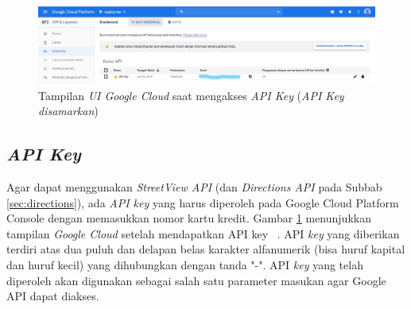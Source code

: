 \begin{figure}[h]
	\centering
		\includegraphics[width=6in]{Gambar/google_cloud.png}
	\caption{Tampilan \textit{UI Google Cloud} saat mengakses \textit{API Key} (\textit{API Key disamarkan})}
	\label{fig:googlecloud}
\end{figure}

\subsection{{\it API Key}}
\label{subs:api-key}
Agar dapat menggunakan {\it StreetView API} (dan \textit{Directions API} pada Subbab \ref{sec:directions}), ada {\it API key} yang harus diperoleh pada Google Cloud Platform Console dengan memasukkan nomor kartu kredit. Gambar \ref{fig:googlecloud} menunjukkan tampilan \textit{Google Cloud} setelah mendapatkan API key ~\cite{api-key}. API {\it key} yang diberikan terdiri atas dua puluh dan delapan belas karakter alfanumerik (bisa huruf kapital dan huruf kecil) yang dihubungkan dengan tanda "-". API {\it key} yang telah diperoleh akan digunakan sebagai salah satu parameter masukan agar Google API dapat diakses.


